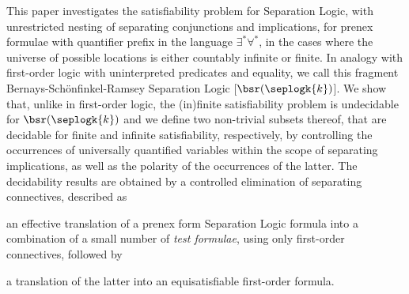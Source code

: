 This paper investigates the satisfiability problem for Separation
Logic, with unrestricted nesting of separating conjunctions and
implications, for prenex formulae with quantifier prefix in the
language $\exists^*\forall^*$, in the cases where the universe of
possible locations is either countably infinite or finite. In analogy with
first-order logic with uninterpreted predicates and equality, we call
this fragment Bernays-Sch\"onfinkel-Ramsey Separation Logic
[$\bsr(\seplogk{k})$]. We %
show  that, unlike in first-order logic, the
(in)finite satisfiability problem is undecidable for
$\bsr(\seplogk{k})$ and we define two non-trivial subsets thereof,
that are decidable for finite and infinite satisfiability,
respectively, by controlling the occurrences of universally quantified
variables within the scope of separating implications, as well as the
polarity of the occurrences of the latter. The decidability results
are obtained by a controlled elimination of separating connectives,
described as \begin{inparaenum}[(i)]
\item an effective translation of a prenex form Separation Logic
  formula into a combination of a small number of \emph{test
    formulae}, using only first-order connectives, followed by
%
\item a translation of the latter into an equisatisfiable first-order
  formula.
\end{inparaenum}

